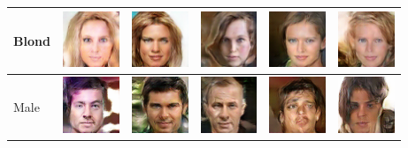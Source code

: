 \begin{table}[ht]
\begin{tabular}{|llllll|}
Blond & \includegraphics[width=1.69cm, height=1.69cm]{Files/images/images4/image86.png}  &\includegraphics[width=1.69cm, height=1.69cm]{Files/images/images4/image64.png}   & \includegraphics[width=1.69cm, height=1.69cm]{Files/images/images4/image91.png}  & \includegraphics[width=1.69cm, height=1.69cm]{Files/images/images4/image5.png}  & \includegraphics[width=1.69cm, height=1.69cm]{Files/images/images4/image25.png} \\ \hline


Male & \includegraphics[width=1.69cm, height=1.69cm]{Files/images/images10/image12.png}  &\includegraphics[width=1.69cm, height=1.69cm]{Files/images/images10/image32.png}   & \includegraphics[width=1.69cm, height=1.69cm]{Files/images/images10/image19.png}  & \includegraphics[width=1.69cm, height=1.69cm]{Files/images/images10/image34.png}  & \includegraphics[width=1.69cm, height=1.69cm]{Files/images/images10/image55.png} \\ \hline


\end{tabular}
\end{table}
